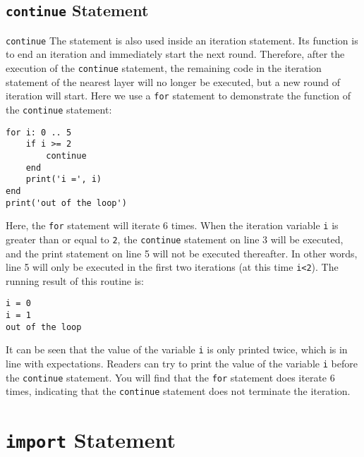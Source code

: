 \subsection{\texttt{continue} Statement}\texttt{continue} The statement is also used inside an iteration statement. Its function is to end an iteration and immediately start the next round. Therefore, after the execution of the \texttt{continue} statement, the remaining code in the iteration statement of the nearest layer will no longer be executed, but a new round of iteration will start. Here we use a \texttt{for} statement to demonstrate the function of the \texttt{continue} statement:
\begin{lstlisting}[language=berry]
for i: 0 .. 5
    if i >= 2
        continue
    end
    print('i =', i)
end
print('out of the loop')
\end{lstlisting}
Here, the \texttt{for} statement will iterate 6 times. When the iteration variable \texttt{i} is greater than or equal to \texttt{2}, the \texttt{continue} statement on line 3 will be executed, and the print statement on line 5 will not be executed thereafter. In other words, line 5 will only be executed in the first two iterations (at this time \texttt{i<2}). The running result of this routine is:
\begin{lstlisting}[numbers=none]
i = 0
i = 1
out of the loop
\end{lstlisting}
It can be seen that the value of the variable \texttt{i} is only printed twice, which is in line with expectations. Readers can try to print the value of the variable \texttt{i} before the \texttt{continue} statement. You will find that the \texttt{for} statement does iterate 6 times, indicating that the \texttt{continue} statement does not terminate the iteration.

\section{\texttt{import} Statement}


